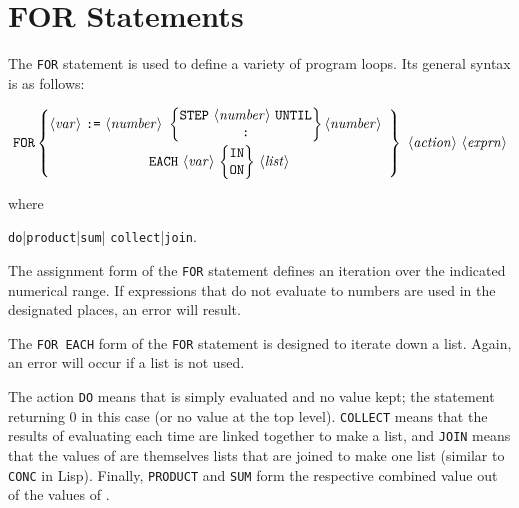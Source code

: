 \section{FOR Statements}
\hypertarget{command:FOR}{}
\hypertarget{command:FOREACH}{}
\hypertarget{reserved:IN}{}
\hypertarget{reserved:DO}{}
\hypertarget{reserved:SUM}{}
\hypertarget{reserved:PRODUCT}{}

The \texttt{FOR} statement is used to define a variety of program
loops.  Its general syntax is as follows:
\begin{small}
\[ \mbox{\texttt{FOR}} \left\{ \begin{array}{@{}ccc@{}}
    \mbox{\meta{var} \texttt{:=} \meta{number} } \left\{ \begin{array}{@{}c@{}}
    \mbox{\texttt{STEP} \meta{number} \texttt{UNTIL}} \\
    \mbox{\texttt{:}}
    \end{array}
    \right\} \mbox{\meta{number}} \\[3mm]
    \multicolumn{1}{c}{\mbox{\texttt{EACH} \meta{var}
       \(\left\{
          \begin{tabular}{@{}c@{}}
              \texttt{IN} \\ \texttt{ON}
          \end{tabular}
       \right\}\)
       \meta{list}}}
    \end{array}
    \right\} \mbox{ \meta{action} \meta{exprn}} \]
\end{small}%
%
where
\begin{syntax}
      \bnfprod \texttt{do}|\texttt{product}|\texttt{sum}|
                            \texttt{collect}|\texttt{join}.
\end{syntax}
The assignment form of the \texttt{FOR} statement defines an
iteration over the indicated numerical range.  If expressions that do not
evaluate to numbers are used in the designated places, an error will
result.

The \texttt{FOR EACH} form of the \texttt{FOR} statement is
designed to iterate down a list.  Again, an error will occur if a list is
not used.

The action \texttt{DO} means that  is simply
evaluated and no value kept; the statement returning 0 in this case (or no
value at the top level). \texttt{COLLECT} means that the results of
evaluating  each time are linked together to make a list,
and \texttt{JOIN} means that the values of  are themselves
lists that are joined to make one list (similar to \texttt{CONC} in Lisp).
Finally, \texttt{PRODUCT} and \texttt{SUM}
form the respective combined value out of the values of .

